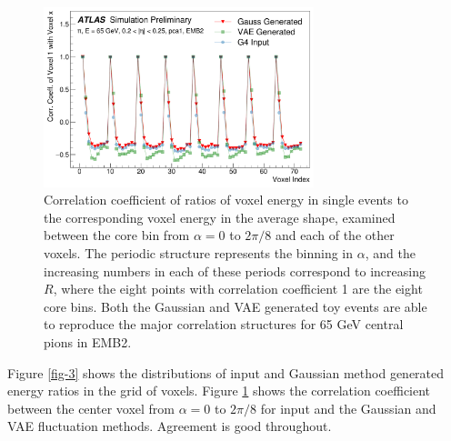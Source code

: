 \begin{figure}[ht!]
\centering
\includegraphics[width=0.7\textwidth]{figures/FCS-fig-01-new.pdf}
\caption{Correlation coefficient of ratios of voxel energy in single events to the corresponding voxel energy in the average shape, examined between the core bin from $\alpha = 0$ to $2\pi/8$ and each of the other voxels. The periodic structure represents the binning in $\alpha$, and the increasing numbers in each of these periods correspond to increasing $R$, where the eight points with correlation coefficient 1 are the eight core bins. Both the Gaussian and VAE generated toy events are able to reproduce the major correlation structures for 65 GeV central pions in EMB2.}
\label{fig-4}       %
\end{figure}

Figure \ref{fig-3} shows the distributions of input \GEANT and Gaussian method generated energy ratios in the grid of voxels. Figure \ref{fig-4} shows the correlation coefficient between the center voxel from $\alpha = 0$ to $2\pi/8$ for input \GEANT and the Gaussian and VAE fluctuation methods. Agreement is good throughout. 

